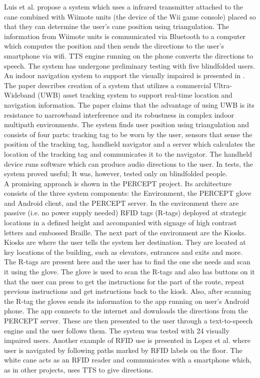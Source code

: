 Luis et al.\cite{luis} propose a system which uses a infrared transmitter attached to the cane combined with Wiimote units (the device of the Wii game console) placed so that they can determine the user's cane position using triangulation. The information from Wiimote units is communicated via Bluetooth to a computer which computes the position and then sends the directions to the user's smartphone via wifi. TTS engine running on the phone converts the directions to speech. The system has undergone preliminary testing with five blindfolded users. \\

An indoor navigation system to support the visually impaired is presented in \cite{riehle}. The paper describes creation of a system that utilizes a commercial Ultra-Wideband (UWB) asset tracking system to support real-time location and navigation information. The paper claims that the advantage of using UWB is its resistance to narrowband interference and its  robustness in complex indoor multipath environments. The system finds user position using triangulation and consists of four parts: tracking tag to be worn by the user, sensors that sense the position of the tracking tag, handheld navigator and a server which calculates the location of the tracking tag and communicates it to the navigator. The handheld device runs software which can produce audio directions to the user. In tests, the system proved useful; It was, however, tested only on blindfolded people.\\

A promising approach is shown in the PERCEPT \cite{percept} project. Its architecture consists of the three system components: the Environment, the PERCEPT glove and Android client, and
the PERCEPT server. In the environment there are passive (i.e. no power supply needed) RFID tags (R-tags) deployed at strategic locations in a defined height and accompanied with signage of high contrast letters and embossed Braille. The next part of the environment are the Kiosks. Kiosks are where the user tells the system her destination. They are located at key locations of the building, such as elevators, entrances and exits and more. The R-tags are present here and the user has to find the one she needs and scan it using the glove.
The glove is used to scan the R-tags and also has buttons on it that the user can press to get the instructions for the part of the route, repeat previous instructions and get instructions back to the kiosk. Also, after scanning the R-tag the gloves sends its information to the app running on user's Android phone. The app connects to the internet and downloads the directions from the PERCEPT server. These are then presented to the user through a text-to-speech engine and the user follows them. The system was tested with 24 visually impaired users.
Another example of RFID use is presented in Lopez et al. \cite{lopez} where user is navigated by following paths marked by RFID labels on the floor. The white cane acts as an RFID reader and communicates with a smartphone which, as in other projects, uses TTS to give directions.
\\

